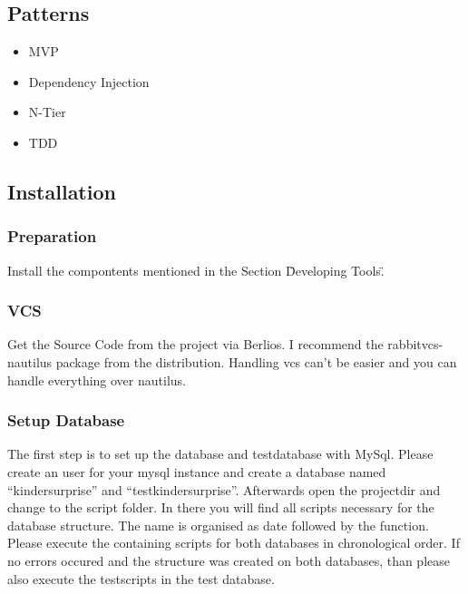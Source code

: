 \documentclass{article}
\begin{document}
\subsection{Patterns}
\begin{itemize}
  \item MVP
  \item Dependency Injection
  \item N-Tier
  \item TDD
\end{itemize}

\subsection{Installation}

\subsubsection{Preparation}

Install the compontents mentioned in the Section \"Developing Tools\".

\subsubsection{VCS}

Get the Source Code from the project via Berlios.
I recommend the rabbitvcs-nautilus package from the distribution. Handling vcs
can't be easier and you can handle everything over nautilus.

\subsubsection{Setup Database}
The first step is to set up the database and testdatabase with MySql.
Please create an user for your mysql instance and create a database named
``kindersurprise'' and ``testkindersurprise''.
Afterwards open the projectdir and change to the script folder.
In there you will find all scripts necessary for the database structure. The
name is organised as date followed by the function.
Please execute the containing scripts for both databases in chronological order.
If no errors occured and the structure was created on both databases, than
please also execute the testscripts in the test database.
\end{document}
